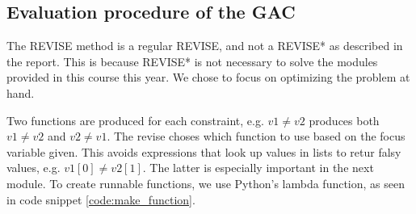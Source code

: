 \subsection{Evaluation procedure of the GAC}
The REVISE method is a regular REVISE, and not a REVISE* as described in the report. This is because REVISE* is not necessary to solve the modules provided in this course this year. We chose to focus on optimizing the problem at hand.

Two functions are produced for each constraint, e.g. \( v1 \neq v2 \) produces both \(v1 \neq v2 \) and \(v2 \neq v1 \). The revise choses which function to use based on the focus variable given. This avoids expressions that look up values in lists to retur falsy values, e.g. \( v1[0] \neq v2[1] \). The latter is especially important in the next module. To create runnable functions, we use Python's lambda function, as seen in code snippet \ref{code:make_function}.

